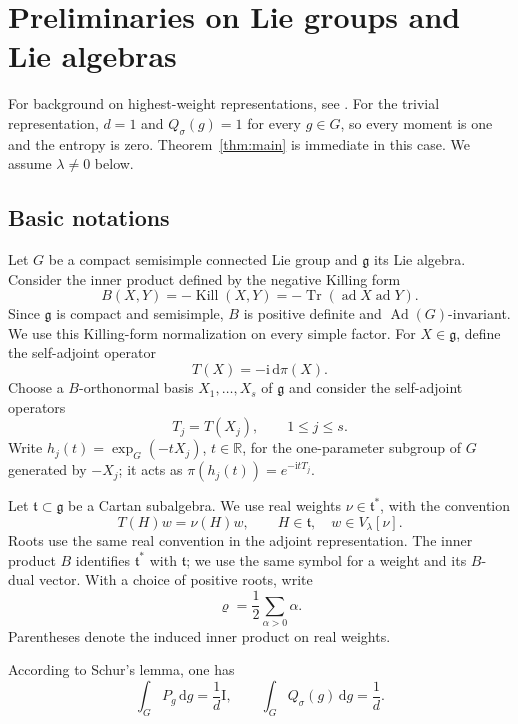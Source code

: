 \documentclass[11pt,reqno]{amsart}
\numberwithin{equation}{section}
\theoremstyle{plain}
\theoremstyle{remark}
\newcommand{\R}{\mathbb R}
\newcommand{\gfrak}{\mathfrak g}
\newcommand{\rh}{\varrho}
\newcommand{\ii}{\mathrm i}
\newcommand{\dd}{\,\mathrm d}
\newcommand{\Id}{\mathrm I}
\newcommand{\Ad}{\operatorname{Ad}}
\begin{document}
\section{Preliminaries on Lie groups and Lie algebras}\label{sec:prelim}

For background on highest-weight representations, see \cite{Humphreys,Knapp}.
For the trivial representation, $d=1$ and $Q_\sigma(g)=1$ for every
$g\in G$, so every moment is one and the entropy is zero.
Theorem~\ref{thm:main} is immediate in this case.  We assume $\lambda\ne0$ below.

\subsection{Basic notations}
Let $G$ be a compact semisimple connected Lie group and $\gfrak$ its Lie algebra.
Consider the inner product defined by the negative Killing form
\begin{equation}\label{eq:killingB}
       B(X,Y)=-\operatorname{Kill}(X,Y)
 =-\operatorname{Tr}
       (\operatorname{ad}X\operatorname{ad}Y).
\end{equation}
Since $\gfrak$ is compact and semisimple, $B$ is positive definite and
$\Ad(G)$-invariant.  We use this Killing-form normalization on every
simple factor.  For $X\in\gfrak$, define the self-adjoint operator
\[
 T(X)=-\ii\,\mathrm d\pi(X).
\]
Choose a $B$-orthonormal basis $X_1,\ldots,X_s$ of $\gfrak$ and consider the self-adjoint operators
\[
 T_j=T(X_j),\qquad 1\le j\le s.
\]
Write $h_j(t)=\exp_G(-tX_j)$, $t\in\R$, for the one-parameter subgroup
of $G$ generated by $-X_j$; it acts as
$\pi(h_j(t))=e^{-\ii tT_j}$.

Let $\mathfrak t\subset\gfrak$ be a Cartan subalgebra.
We use real weights $\nu\in\mathfrak t^*$, with the convention
\[
 T(H)w=\nu(H)w,\qquad H\in\mathfrak t,\quad w\in V_\lambda[\nu].
\]
Roots use the same real convention in the adjoint representation.
The inner product $B$ identifies $\mathfrak t^*$ with $\mathfrak t$;
we use the same symbol for a weight and its $B$-dual vector.
With a choice of positive roots, write
\[
 \rh=\frac12\sum_{\alpha>0}\alpha.
\]
Parentheses denote the induced inner product on real weights.

According to Schur's lemma, one has
\begin{equation}\label{eq:normalization}
 \int_G P_g\dd g=\frac1d\Id,\qquad
 \int_G Q_\sigma(g)\dd g=\frac1d.
\end{equation}
\end{document}

